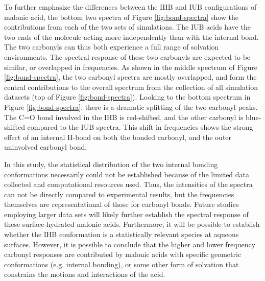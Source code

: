 To further emphasize the differences between the IHB and IUB configurations of malonic acid, the bottom two spectra of Figure \ref{fig:bond-spectra} show the contributions from each of the two sets of simulations. The IUB acids have the two ends of the molecule acting more independently than with the internal bond. The two carbonyls can thus both experience a full range of solvation environments. The spectral response of these two carbonyls are expected to be similar, or overlapped in frequencies. As shown in the middle spectrum of Figure \ref{fig:bond-spectra}, the two carbonyl spectra are mostly overlapped, and form the central contributions to the overall spectrum from the collection of all simulation datasets (top of Figure \ref{fig:bond-spectra}). Looking to the bottom spectrum in Figure \ref{fig:bond-spectra}, there is a dramatic splitting of the two carbonyl peaks. The C=O bond involved in the IHB is red-shifted, and the other carbonyl is blue-shifted compared to the IUB spectra. This shift in frequencies shows the strong effect of an internal H-bond on both the bonded carbonyl, and the outer uninvolved carbonyl bond.

In this study, the statistical distribution of the two internal bonding conformations necessarily could not be established because of the limited data collected and computational resources used. Thus, the intensities of the spectra can not be directly compared to experimental results, but the frequencies themselves are representational of those for carbonyl bonds. Future studies employing larger data sets will likely further establish the spectral response of these surface-hydrated malonic acids. Furthermore, it will be possible to establish whether the IHB conformation is a statistically relevant species at aqueous surfaces. However, it is possible to conclude that the higher and lower frequency carbonyl responses are contributed by malonic acids with specific geometric conformations (e.g. internal bonding), or some other form of solvation that constrains the motions and interactions of the acid.
